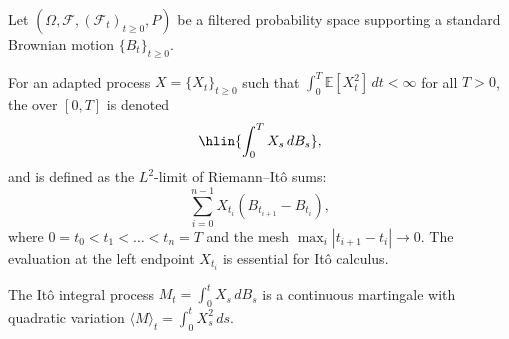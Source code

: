 \begin{definition} \label{definition:ito_integral_with_respect_to_brownian_motion}
Let $(\Omega, \mathcal{F}, (\mathcal{F}_t)_{t \geq 0}, P)$ be a filtered probability space supporting a standard Brownian motion $\{B_t\}_{t \geq 0}$.

For an adapted process $X = \{X_t\}_{t \geq 0}$ such that $\int_0^T \mathbb{E}[X_t^2] \, dt < \infty$ for all $T > 0$, the  over $[0, T]$ is denoted
$$\hlin{\int_0^T X_s \, dB_s},$$
and is defined as the $L^2$-limit of Riemann--Itô sums:
$$\sum_{i=0}^{n-1} X_{t_i} (B_{t_{i+1}} - B_{t_i}),$$
where $0 = t_0 < t_1 < \dots < t_n = T$ and the mesh $\max_i |t_{i+1} - t_i| \to 0$. The evaluation at the left endpoint $X_{t_i}$ is essential for Itô calculus.

The Itô integral process $M_t = \int_0^t X_s \, dB_s$ is a continuous martingale with quadratic variation $\langle M \rangle_t = \int_0^t X_s^2 \, ds$.
\end{definition}
